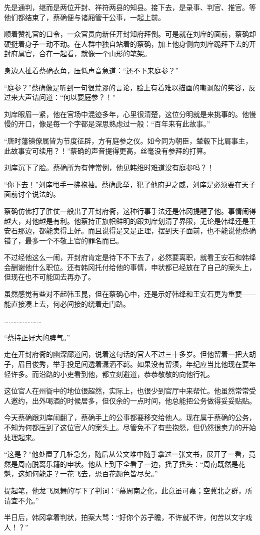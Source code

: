 先是通判，继而是两位开封、祥符两县的知县。接下去，是录事、判官、推官。等他们都结束了，蔡确便与诸厢管干公事，一起上前。

顺着赞礼官的口令，一众官员向新任开封知府拜倒。可是就在刘庠的面前，蔡确却硬挺着身子一动不动。在人群中独自站着的蔡确，加上他身侧向刘庠跪拜下去的开封府属官，合在一起看，就像一个山形的笔架。

身边人扯着蔡确衣角，压低声音急道：“还不下来庭参？”

“庭参？”蔡确像是听到一句很荒谬的言论，脸上有着难以描画的嘲讽般的笑容，反过来大声诘问道：“何以要庭参？！”

刘庠眼眉一紧，他在官场中混迹多年，心里很清楚，这位分明就是来挑事的。他慢慢的开口，像是每一个字都是深思熟虑过一般：“百年来有此故事。”

“唐时藩镇僚属皆为节度征辟，方有庭参之仪。如今同为朝臣，辇毂下比肩事主，此故事安可续用？！”蔡确的声音提得更高，丝毫没有参拜的打算。

刘庠沉下了脸。蔡确所为有悖常例，他见韩维时难道没有庭参吗？！

“你下去！”刘庠甩手一拂袍袖。蔡确此举，犯了他府尹之威，刘庠是必须要在天子面前讨个说法的。

蔡确仿佛打了胜仗一般出了开封府衙，这种行事手法还是韩冈提醒了他。事情闹得越大，对他越是有利。他蔡持正旗帜鲜明的跟刘庠划清了界限，无论是韩绛还是王安石那边，都能卖得上好。而且说得是又是正理，摆到天子面前，也不能说他蔡确错了，最多一个不敬上官的罪名而已。

不过经他这么一闹，开封府肯定是待下不下去了，必然要离职，就看王安石和韩绛会酬谢他什么职位。还有韩冈托付给他的事情，申状都已经放在了自己的案头上，但现在也不可能回去再办了。

虽然感觉有些对不起韩玉昆，但在蔡确心中，还是示好韩绛和王安石更为重要——能直接凑上去，何必间接的绕着走门路。

……………………

“蔡持正好大的脾气。”

走在开封府衙的幽深廊道间，说着这句话的官人不过三十多岁。但他留着一把大胡子，眉目俊秀，举手投足间透着潇洒不羁。如果没有留须，年纪应当比他现在要年轻许多。而沿路的小吏看到他，都立刻避道，恭恭敬敬的向他行礼。

这位官人在州衙中的地位很超然，实际上，也很少到官厅中来帮忙。他虽然常常受人邀约，出外喝酒的时候居多，但仅余的一点时间，他总能把公务做得妥妥贴贴。

今天蔡确跟刘庠闹翻了，蔡确手上的公事都要移交给他人。现在属于蔡确的公务，不知为何都压到了这位官人的案头上。尽管免不了有些抱怨，但仍然很卖力的开始处理起来。

“这是？”他处置了几桩急务，随后从公文堆中随手拿过一张文书，展开了一看，竟然是周南脱离乐籍的申状。他从上到下全看了一边，摇了摇头：“周南既然是花魁，这如何能走？一花飞去，恐百花颜色皆尽矣。”

提起笔，他龙飞凤舞的写下了判词：“慕周南之化，此意虽可嘉；空冀北之群，所请宜不允。”

半日后，韩冈拿着判状，拍案大骂：“好你个苏子瞻，不许就不许，何苦以文字戏人！？”

